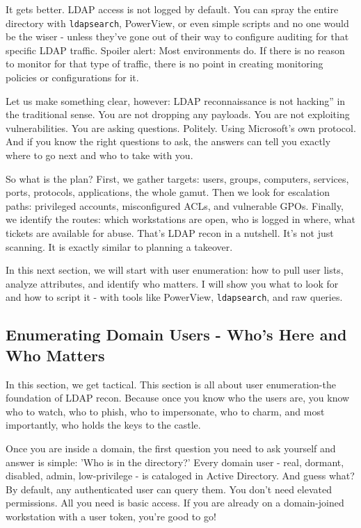 It gets better. LDAP access is not logged by default. You can spray the entire directory with \texttt{ldapsearch}, PowerView, or even simple scripts and no one would be the wiser - unless they’ve gone out of their way to configure auditing for that specific LDAP traffic. Spoiler alert: Most environments do. If there is no reason to monitor for that type of traffic, there is no point in creating monitoring policies or configurations for it.

Let us make something clear, however: LDAP reconnaissance is not hacking'' in the traditional sense. You are not dropping any payloads. You are not exploiting vulnerabilities. You are asking questions. Politely. Using Microsoft’s own protocol. And if you know the right questions to ask, the answers can tell you exactly where to go next and who to take with you.

So what is the plan? First, we gather targets: users, groups, computers, services, ports, protocols, applications, the whole gamut. Then we look for escalation paths: privileged accounts, misconfigured ACLs, and vulnerable GPOs. Finally, we identify the routes: which workstations are open, who is logged in where, what tickets are available for abuse. That’s LDAP recon in a nutshell. It’s not just scanning. It is exactly similar to planning a takeover.

In this next section, we will start with user enumeration: how to pull user lists, analyze attributes, and identify who matters. I will show you what to look for and how to script it - with tools like PowerView, \texttt{ldapsearch}, and raw queries.

\subsection{Enumerating Domain Users - Who’s Here and Who Matters}

In this section, we get tactical. This section is all about user enumeration-the foundation of LDAP recon. Because once you know who the users are, you know who to watch, who to phish, who to impersonate, who to charm, and most importantly, who holds the keys to the castle.

Once you are inside a domain, the first question you need to ask yourself and answer is simple: 'Who is in the directory?' Every domain user - real, dormant, disabled, admin, low-privilege - is cataloged in Active Directory. And guess what? By default, any authenticated user can query them. You don’t need elevated permissions. All you need is basic access. If you are already on a domain-joined workstation with a user token, you’re good to go!

